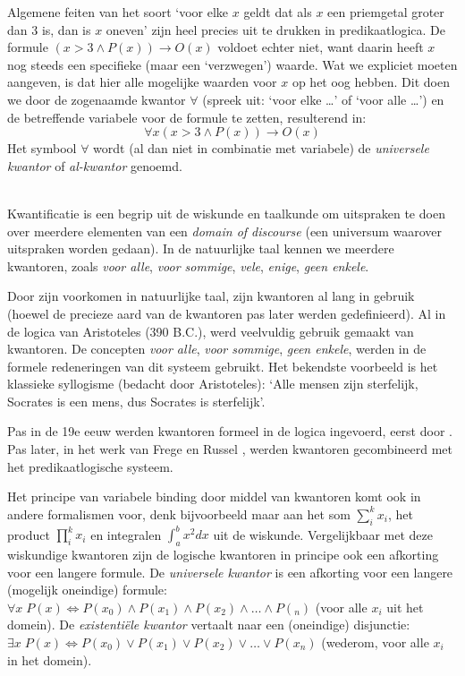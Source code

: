 Algemene feiten van het soort `voor elke $x$ geldt dat als $x$ een priemgetal groter dan 3 is, dan is $x$ oneven' zijn heel precies uit te drukken in predikaatlogica. De formule $(x>3\wedge P(x))\rightarrow O(x)$ voldoet echter niet, want daarin heeft $x$ nog steeds een specifieke (maar een `verzwegen') waarde. Wat we expliciet moeten aangeven, is dat hier alle mogelijke waarden voor $x$ op het oog hebben. Dit doen we door de zogenaamde kwantor $\forall$ (spreek uit: `voor elke \ldots' of `voor alle \ldots') en de betreffende variabele voor de formule te zetten, resulterend in:
$$\forall x(x>3\wedge P(x))\rightarrow O(x)$$
Het symbool $\forall$ wordt (al dan niet in combinatie met variabele) de \textit{universele kwantor} of \textit{al-kwantor} genoemd.

\begin{aside}\mbox{}\\
Kwantificatie is een begrip uit de wiskunde en taalkunde om uitspraken te doen over meerdere elementen van een \textit{domain of discourse} (een universum waarover uitspraken worden gedaan). In de natuurlijke taal kennen we meerdere kwantoren, zoals \textit{voor alle}, \textit{voor sommige}, \textit{vele}, \textit{enige}, \textit{geen enkele}.

Door zijn voorkomen in natuurlijke taal, zijn kwantoren al lang in gebruik (hoewel de precieze aard van de kwantoren pas later werden gedefinieerd). Al in de logica van Aristoteles (390 B.C.), werd veelvuldig gebruik gemaakt van kwantoren. De concepten \textit{voor alle}, \textit{voor sommige}, \textit{geen enkele}, werden in de formele redeneringen van dit systeem gebruikt. Het bekendste voorbeeld is het klassieke syllogisme (bedacht door Aristoteles): `Alle mensen zijn sterfelijk, Socrates is een mens, dus Socrates is sterfelijk'.

Pas in de 19e eeuw werden kwantoren formeel in de logica ingevoerd, eerst door . Pas later, in het werk van Frege \cite{frege:begriffschrift} en Russel \cite{russel:principia:1,russel:principia:2,russel:principia:3}, werden kwantoren gecombineerd met het predikaatlogische systeem.

Het principe van variabele binding door middel van kwantoren komt ook in andere formalismen voor, denk bijvoorbeeld maar aan het som $\sum^k_i x_i$, het product $\prod^k_i x_i$ en integralen $\int_{a}^{b} x^2 dx$ uit de wiskunde. Vergelijkbaar met deze wiskundige kwantoren zijn de logische kwantoren in principe ook een afkorting voor een langere formule. De \textit{universele kwantor} is een afkorting voor een langere (mogelijk oneindige) formule: $\forall x\;P(x) \Leftrightarrow P(x_0)\wedge P(x_1)\wedge P(x_2)\wedge\ldots\wedge P(_n)$ (voor alle $x_i$ uit het domein). De \textit{existenti\"ele kwantor} vertaalt naar een (oneindige) disjunctie: $\exists x\;P(x)\Leftrightarrow P(x_0)\vee P(x_1)\vee P(x_2)\vee\ldots\vee P(x_n)$ (wederom, voor alle $x_i$ in het domein).
\end{aside}

